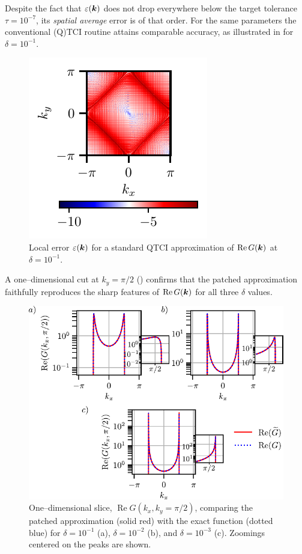 Despite the fact that \(\varepsilon(\boldsymbol{k})\) does not drop everywhere below the target tolerance \(\tau=10^{-7}\), its \emph{spatial average} error is of that
order. For the same parameters the conventional (Q)TCI routine attains comparable accuracy, as illustrated in  for \(\delta=10^{-1}\).
\begin{figure}[htbp]
    \centering
    \includegraphics{figures/heatmap_TCI_error_2DGreen_ω_0.1_δ_0.1_R_15_abstol_1.0e-7_unfol_fused.pdf}
    \caption{Local error \(\varepsilon(\boldsymbol{k})\) for a standard QTCI approximation of \(\operatorname{Re}G(\boldsymbol{k})\) at \(\delta=10^{-1}\).}
    \label{fig:TCI2DGreenerror}
\end{figure}
A one–dimensional cut at \(k_{y}=\pi/2\) () confirms that the patched approximation faithfully reproduces the sharp features of \(\operatorname{Re}G(\boldsymbol{k})\) for all three
\(\delta\) values.
\begin{figure}[htbp]
    \centering
    \includegraphics{figures/lineError2DGreen.pdf}
    \caption{One–dimensional slice,
           \(\operatorname{Re}G(k_{x},k_{y}=\pi/2)\),
           comparing the patched approximation (solid red) with the exact
           function (dotted blue) for
           \(\delta=10^{-1}\) (a),
           \(\delta=10^{-2}\) (b),
           and \(\delta=10^{-3}\) (c). Zoomings centered on the peaks are shown.}
    \label{fig:lineError2DGreen}
\end{figure}

